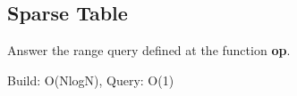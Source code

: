 \subsection{Sparse Table}

Answer the range query defined at the function \textbf{op}.

Build: O(NlogN), Query: O(1)
